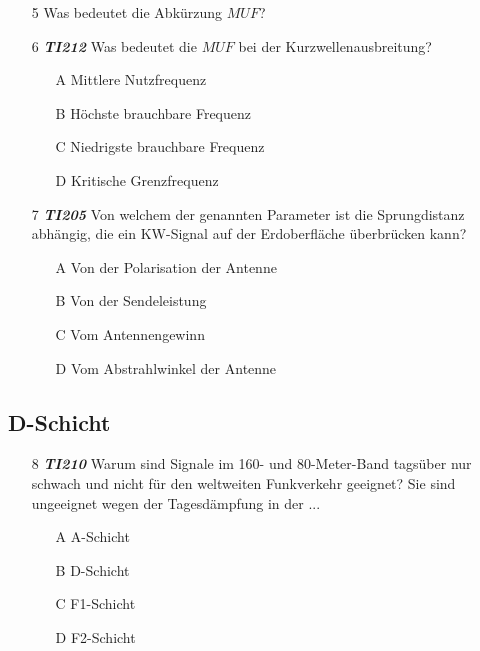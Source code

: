 \begin{enumerate} 
\itemsep1pt\parskip0pt
\item[5] Was bedeutet die Abkürzung $MUF$? 
\item[6] \emph{\textbf{TI212}}   Was bedeutet die $MUF$ bei der Kurzwellenausbreitung?
	\begin{enumerate}
	\itemsep1pt\parskip0pt
		\item[A] Mittlere Nutzfrequenz
		\item[B] Höchste brauchbare Frequenz
		\item[C] Niedrigste brauchbare Frequenz
		\item[D] Kritische Grenzfrequenz
	\end{enumerate}
\end{enumerate}

\begin{enumerate} 
\itemsep1pt\parskip0pt
\item[7] \emph{\textbf{TI205}}   Von welchem der genannten Parameter ist die Sprungdistanz abhängig, die ein KW-Signal auf der Erdoberfläche überbrücken kann?
	\begin{enumerate}
	\itemsep1pt\parskip0pt
		\item[A] Von der Polarisation der Antenne
		\item[B] Von der Sendeleistung
		\item[C] Vom Antennengewinn
		\item[D] Vom Abstrahlwinkel der Antenne
	\end{enumerate}
\end{enumerate}

\subsection*{D-Schicht}

\begin{enumerate} 
\itemsep1pt\parskip0pt
\item[8] \emph{\textbf{TI210}}   Warum sind Signale im 160- und 80-Meter-Band tagsüber nur schwach und nicht für den weltweiten Funkverkehr geeignet? Sie sind ungeeignet wegen der Tagesdämpfung in der ...
	\begin{enumerate}
	\itemsep1pt\parskip0pt
		\item[A] A-Schicht
		\item[B] D-Schicht
		\item[C] F1-Schicht
		\item[D] F2-Schicht
	\end{enumerate}
\end{enumerate}


